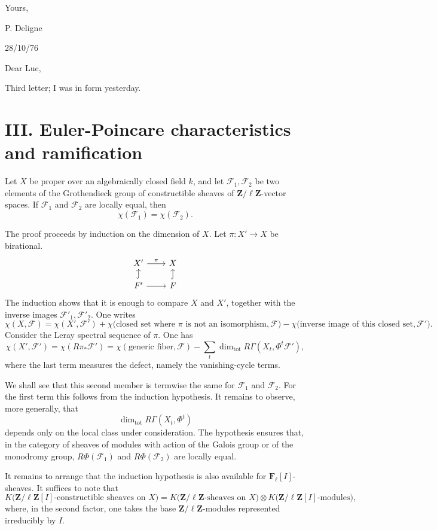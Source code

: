 \documentclass[11pt]{article}
\newcommand{\F}{\mathcal F}
\newcommand{\Zell}{\mathbf Z/\ell\mathbf Z}
\newcommand{\Fell}{\mathbf F_\ell}
\DeclareMathOperator{\Tot}{tot}
\begin{document}
Yours,

\hspace{2em}P. Deligne

\newpage

\begin{flushright}
28/10/76
\end{flushright}

Dear Luc,

Third letter; I was in form yesterday.

\section*{III. Euler-Poincare characteristics and ramification}

Let \(X\) be proper over an algebraically closed field \(k\), and let \(\F_1,\F_2\) be two elements of the Grothendieck group of constructible sheaves of \(\Zell\)-vector spaces. If \(\F_1\) and \(\F_2\) are locally equal, then
\[
  \chi(\F_1)=\chi(\F_2).
\]

The proof proceeds by induction on the dimension of \(X\). Let \(\pi:X'\to X\) be birational.
\[
\begin{tikzcd}[column sep=2.2em,row sep=1.2em]
X' \arrow[r,"\pi"] & X \\
F' \arrow[u,hook] \arrow[r] & F \arrow[u,hook]
\end{tikzcd}
\] The induction shows that it is enough to compare \(X\) and \(X'\), together with the inverse images \(\F'_1,\F'_2\). One writes
\[
  \chi(X,\F)=\chi(X',\F')+
  \chi\bigl(\text{closed set where }\pi\text{ is not an isomorphism},\F\bigr)
  -\chi\bigl(\text{inverse image of this closed set},\F'\bigr).
\]
Consider the Leray spectral sequence of \(\pi\). One has
\[
  \chi(X',\F')
  =\chi(R\pi_*\F')
  =\chi(\text{generic fiber},\F)
   -\sum_t \dim_{\Tot}R\Gamma(X_t,\Phi^t\F'),
\]
where the last term measures the defect, namely the vanishing-cycle terms.

We shall see that this second member is termwise the same for \(\F_1\) and \(\F_2\). For the first term this follows from the induction hypothesis. It remains to observe, more generally, that
\[
  \dim_{\Tot} R\Gamma(X_t,\Phi^t)
\tag{1}
\]
depends only on the local class under consideration. The hypothesis ensures that, in the category of sheaves of modules with action of the Galois group or of the monodromy group, \(R\Phi(\F_1)\) and \(R\Phi(\F_2)\) are locally equal.

It remains to arrange that the induction hypothesis is also available for \(\Fell[I]\)-sheaves. It suffices to note that
\[
K\bigl(\Zell[I]\text{-constructible sheaves on }X\bigr)
=
K\bigl(\Zell\text{-sheaves on }X\bigr)
\otimes
K\bigl(\Zell[I]\text{-modules}\bigr),
\]
where, in the second factor, one takes the base \(\Zell\)-modules represented irreducibly by \(I\).
\end{document}
